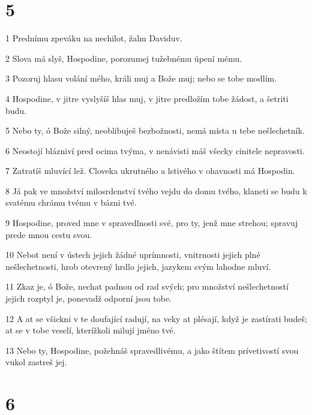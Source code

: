 \chapter{5}

\par 1 Prednímu zpeváku na nechilot, žalm Daviduv.
\par 2 Slova má slyš, Hospodine, porozumej tužebnému úpení mému.
\par 3 Pozoruj hlasu volání mého, králi muj a Bože muj; nebo se tobe modlím.
\par 4 Hospodine, v jitre vyslyšíš hlas muj, v jitre predložím tobe žádost, a šetriti budu.
\par 5 Nebo ty, ó Bože silný, neoblibuješ bezbožnosti, nemá místa u tebe nešlechetník.
\par 6 Neostojí blázniví pred ocima tvýma, v nenávisti máš všecky cinitele nepravosti.
\par 7 Zatratíš mluvící lež. Cloveka ukrutného a lstivého v ohavnosti má Hospodin.
\par 8 Já pak ve množství milosrdenství tvého vejdu do domu tvého, klaneti se budu k svatému chrámu tvému v bázni tvé.
\par 9 Hospodine, proved mne v spravedlnosti své, pro ty, jenž mne strehou; spravuj prede mnou cestu svou.
\par 10 Nebot není v ústech jejich žádné uprímnosti, vnitrnosti jejich plné nešlechetnosti, hrob otevrený hrdlo jejich, jazykem svým lahodne mluví.
\par 11 Zkaz je, ó Bože, nechat padnou od rad svých; pro množství nešlechetností jejich rozptyl je, ponevadž odporní jsou tobe.
\par 12 A at se všickni v te doufající radují, na veky at plésají, když je zastírati budeš; at se v tobe veselí, kterížkoli milují jméno tvé.
\par 13 Nebo ty, Hospodine, požehnáš spravedlivému, a jako štítem prívetivostí svou vukol zastreš jej.

\chapter{6}


